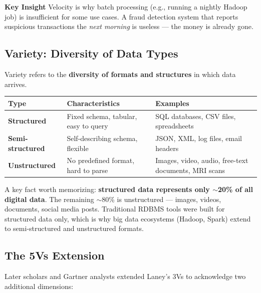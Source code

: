 \documentclass[12pt,a4paper]{article}
\newcommand{\insightbox}[1]{%
  \noindent
  \colorbox{PUGold!18}{%
    \begin{minipage}{\dimexpr\linewidth-2\fboxsep}
      \vspace{4pt}
      \textcolor{PUGold!70!black}{\textbf{Key Insight}} \quad #1
      \vspace{4pt}
    \end{minipage}%
  }\par\vspace{6pt}%
}
\begin{document}
\insightbox{Velocity is why batch processing (e.g., running a nightly Hadoop job) is insufficient for some use cases. A fraud detection system that reports suspicious transactions the \textit{next morning} is useless — the money is already gone.}

\subsection{Variety: Diversity of Data Types}

Variety refers to the \textbf{diversity of formats and structures} in which data arrives.

\begin{center}
\renewcommand{\arraystretch}{1.4}
\begin{tabular}{p{2.8cm}p{5.0cm}p{4.8cm}}
  \toprule
  \textbf{Type} & \textbf{Characteristics} & \textbf{Examples} \\
  \midrule
  \textbf{Structured} & Fixed schema, tabular, easy to query &
    SQL databases, CSV files, spreadsheets \\
  \textbf{Semi-structured} & Self-describing schema, flexible &
    JSON, XML, log files, email headers \\
  \textbf{Unstructured} & No predefined format, hard to parse &
    Images, video, audio, free-text documents, MRI scans \\
  \bottomrule
\end{tabular}
\end{center}

A key fact worth memorizing: \textbf{structured data represents only $\sim$20\% of all digital data}. The remaining $\sim$80\% is unstructured — images, videos, documents, social media posts. Traditional RDBMS tools were built for structured data only, which is why big data ecosystems (Hadoop, Spark) extend to semi-structured and unstructured formats.

\subsection{The 5Vs Extension}

Later scholars and Gartner analysts extended Laney's 3Vs to acknowledge two additional dimensions:
\end{document}
